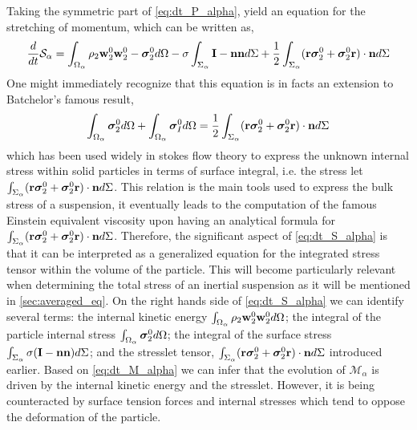 Taking the symmetric part of \ref{eq:dt_P_alpha}, yield an equation for the stretching of momentum, which can be written as,
\begin{equation}    
    \frac{d}{d t}{\mathcal{S}_\alpha}
    =  \int_{\Omega_\alpha} 
        \rho_2\textbf{w}_2^0 \textbf{w}_2^0
        - \bm{\sigma}_2^0 d\Omega
        - \sigma\int_{\Sigma_\alpha} \textbf{I}-\textbf{nn} d\Sigma
        + \frac{1}{2}\int_{\Sigma_\alpha} (\textbf{r}\bm\sigma_2^0+ \bm\sigma_2^0\textbf{r})\cdot \textbf{n} d\Sigma
    \label{eq:dt_S_alpha}
\end{equation}
One might immediately recognize that this equation is in facts an extension to Batchelor’s famous result, 
\begin{equation*}
    \int_{\Omega_\alpha} \bm{\sigma}_2^0 d\Omega
    + \int_{\Omega_\alpha} \bm{\sigma}_I^0 d\Omega
    = \frac{1}{2}\int_{\Sigma_\alpha} (\textbf{r}\bm\sigma_2^0+ \bm\sigma_2^0\textbf{r})\cdot \textbf{n} d\Sigma
\end{equation*}
which has been used widely in stokes flow theory to express the unknown internal stress within solid particles in terms of surface integral, i.e. the stress let $\int_{\Sigma_\alpha} (\textbf{r}\bm\sigma_2^0+ \bm\sigma_2^0\textbf{r})\cdot \textbf{n} d\Sigma$.
This relation is the main tools used to express the bulk stress of a suspension, it eventually leads to the computation of the famous Einstein equivalent viscosity upon having an analytical formula for $\int_{\Sigma_\alpha} (\textbf{r}\bm\sigma_2^0+ \bm\sigma_2^0\textbf{r})\cdot \textbf{n} d\Sigma$. 
Therefore, the significant aspect of \ref{eq:dt_S_alpha} is that it can be interpreted as a generalized equation for the integrated stress tensor within the volume of the particle.
This will become particularly relevant when determining the total stress of an inertial suspension as it will be mentioned in \ref{sec:averaged_eq}.
On the right hands side of \ref{eq:dt_S_alpha} we can identify several terms: 
the internal kinetic energy $\int_{\Omega_\alpha} \rho_2\textbf{w}_2^0\textbf{w}_2^0  d\Omega$; 
the integral of the particle internal stress $\int_{\Omega_\alpha}  \bm{\sigma}_2^0
  d\Omega$; 
the integral of the surface stress $\int_{\Sigma_\alpha}  \sigma (\textbf{I}- \textbf{nn})  d\Sigma$; 
and the stresslet tensor, $\int_{\Sigma_\alpha} (\textbf{r}\bm\sigma_2^0+ \bm\sigma_2^0\textbf{r})\cdot \textbf{n} d\Sigma$ introduced earlier.
Based on \ref{eq:dt_M_alpha} we can infer that the evolution of $\mathcal{M}_\alpha$ is driven by the internal kinetic energy and the stresslet.
However, it is being counteracted by surface tension forces and internal stresses which tend to oppose the deformation of the particle. 
